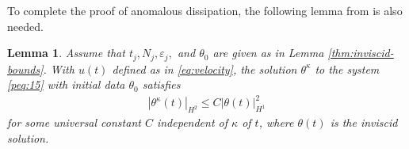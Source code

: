\documentclass[12pt]{report}   %
\renewcommand{\le}{\leqslant}
\numberwithin{equation}{section}
\theoremstyle{plain}
\newtheorem{lemma}{Lemma}[section]
\theoremstyle{definition}
\theoremstyle{remark}
\newcommand{\eps}{{\varepsilon}}
\begin{document}
To complete the proof of anomalous dissipation, the following lemma from \cite{DrivasElgindiEA22} is also needed.
\begin{lemma}\label{thm:viscous-bounds}
	Assume that $t_j, N_j, \eps_j,$ and $\theta_0$ are given as in Lemma \ref{thm:inviscid-bounds}. With $u(t)$ defined as in \eqref{eq:velocity}, the solution $\theta^{\kappa}$ to the system \eqref{peq:15} with initial data $\theta_0$ satisfies \begin{equation*}
	\begin{split}
	|\theta^{\kappa}(t)|_{H^2} \le C|\theta(t)|_{H^1}^2
	\end{split}
	\end{equation*} for some universal constant $C$ independent of $\kappa$ of $t$, where $\theta(t)$ is the inviscid solution. 
\end{lemma}
\end{document}
